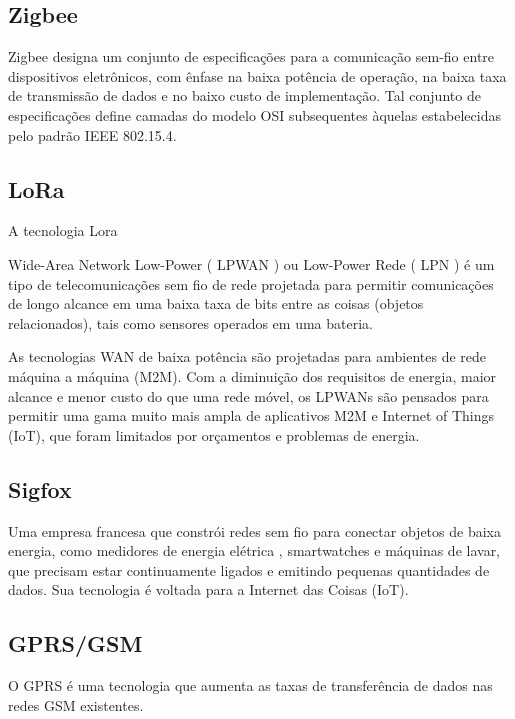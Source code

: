 \subsection{Zigbee}

Zigbee designa um conjunto de especificações para a comunicação sem-fio entre dispositivos eletrônicos, com ênfase na baixa potência de operação, na baixa taxa de transmissão de dados e no baixo custo de implementação. Tal conjunto de especificações define camadas do modelo OSI subsequentes àquelas estabelecidas pelo padrão IEEE 802.15.4.


\subsection{LoRa}

A tecnologia Lora

Wide-Area Network Low-Power ( LPWAN ) ou Low-Power Rede ( LPN ) é um tipo de telecomunicações sem fio de rede projetada para permitir comunicações de longo alcance em uma baixa taxa de bits entre as coisas (objetos relacionados), tais como sensores operados em uma bateria.

As tecnologias WAN de baixa potência são projetadas para ambientes de rede máquina a máquina (M2M). Com a diminuição dos requisitos de energia, maior alcance e menor custo do que uma rede móvel, os LPWANs são pensados para permitir uma gama muito mais ampla de aplicativos M2M e Internet of Things (IoT), que foram limitados por orçamentos e problemas de energia.



\subsection{Sigfox}

Uma empresa francesa que constrói redes sem fio para conectar objetos de baixa energia, como medidores de energia elétrica , smartwatches e máquinas de lavar, que precisam estar continuamente ligados e emitindo pequenas quantidades de dados. Sua tecnologia é voltada para a Internet das Coisas (IoT).
 


\subsection{GPRS/GSM}


O \ac{GPRS} é uma tecnologia que aumenta as taxas de transferência de dados nas redes \ac{GSM} existentes. 


